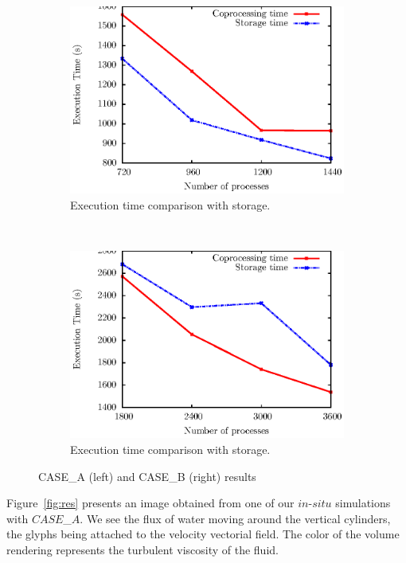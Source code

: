 \begin{figure}
        \begin{subfigure}[b]{0.50\textwidth}
                \includegraphics[scale=0.50]{pictures/test2.ps}
                \caption{Execution time comparison with storage.}
                \label{fig:ensight}
        \end{subfigure}
        ~
        \begin{subfigure}[b]{0.50\textwidth}
                \includegraphics[scale=0.50]{pictures/test22.ps}
                \caption{Execution time comparison with storage.}
                \label{fig:204ensight}
        \end{subfigure}
        \caption{CASE\_A (left) and CASE\_B (right) results}\label{fig:animals}
\end{figure}

Figure~\ref{fig:res} presents an image obtained from one of our $in$-$situ$
simulations with $CASE$\_$A$.
We see the flux of water moving around the vertical cylinders, the glyphs being attached 
to the velocity vectorial field. The color of the volume rendering represents 
the turbulent viscosity of the fluid. 

